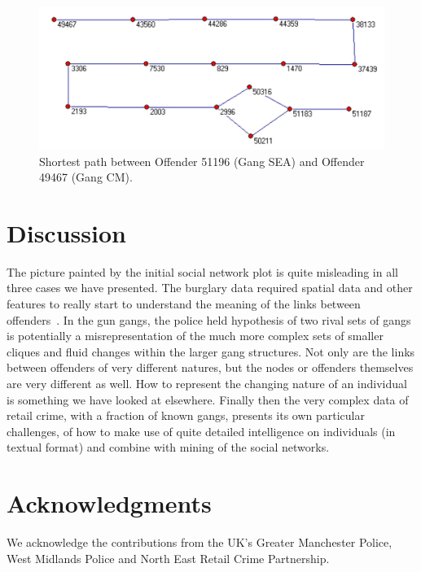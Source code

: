 \documentclass[conference]{IEEEtran}
\theoremstyle{definition}
\begin{document}
\begin{figure}[!ht] 
\centering
\includegraphics[width=\columnwidth]{images/path3}
\caption{Shortest path between Offender 51196 (Gang SEA) and Offender 49467 (Gang CM).}
\label{fig:path3}
\end{figure}


\section{Discussion}\label{sec:discussion}
The picture painted by the initial social network plot is quite
misleading in all three cases we have presented. The burglary data
required spatial data and other features to really start to understand
the meaning of the links between
offenders~\cite{JohnsonBowers2004,EwartOatley2005}. In the gun gangs,
the police held hypothesis of two rival sets of gangs is potentially a
misrepresentation of the much more complex sets of smaller cliques and
fluid changes within the larger gang structures. Not only are the
links between offenders of very different natures, but the nodes or
offenders themselves are very different as well. How to represent the
changing nature of an individual is something we have looked at
elsewhere. Finally then the very complex data of retail crime, with a
fraction of known gangs, presents its own particular challenges, of
how to make use of quite detailed intelligence on individuals (in
textual format) and combine with mining of the social networks.


\section*{Acknowledgments}
We acknowledge the contributions from the UK's Greater Manchester Police,
West Midlands Police and North East Retail Crime Partnership.

{}

\end{document}

